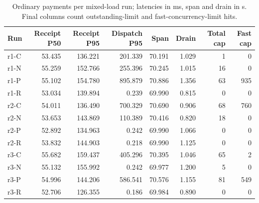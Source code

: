 \begin{table}[htbp]
\centering\small
\caption{Ordinary payments per mixed-load run; latencies in ms, span and drain in s. Final columns count outstanding-limit and fast-concurrency-limit hits.}
\label{tab:supp-final-mixed}
\begin{tabular}{@{}lrrrrrrr@{}}
\toprule
Run & Receipt P50 & Receipt P95 & Dispatch P95 & Span & Drain & Total cap & Fast cap \\
\midrule
r1-C & 53.435 & 136.221 & 201.339 & 70.191 & 1.029 & 1 & 0 \\
r1-N & 55.259 & 152.766 & 255.396 & 70.245 & 1.015 & 16 & 0 \\
r1-P & 55.102 & 154.780 & 895.879 & 70.886 & 1.356 & 63 & 935 \\
r1-R & 53.034 & 139.894 & 0.239 & 69.990 & 0.815 & 0 & 0 \\
r2-C & 54.011 & 136.490 & 700.329 & 70.690 & 0.906 & 68 & 760 \\
r2-N & 53.653 & 143.869 & 110.389 & 70.416 & 0.820 & 18 & 0 \\
r2-P & 52.892 & 134.963 & 0.242 & 69.990 & 1.066 & 0 & 0 \\
r2-R & 53.832 & 144.903 & 0.218 & 69.990 & 1.125 & 0 & 0 \\
r3-C & 55.682 & 159.437 & 405.296 & 70.395 & 1.046 & 65 & 2 \\
r3-N & 55.132 & 155.992 & 0.242 & 69.977 & 1.200 & 5 & 0 \\
r3-P & 54.996 & 144.206 & 586.541 & 70.576 & 1.155 & 81 & 549 \\
r3-R & 52.706 & 126.355 & 0.186 & 69.984 & 0.890 & 0 & 0 \\
\bottomrule
\end{tabular}
\end{table}
